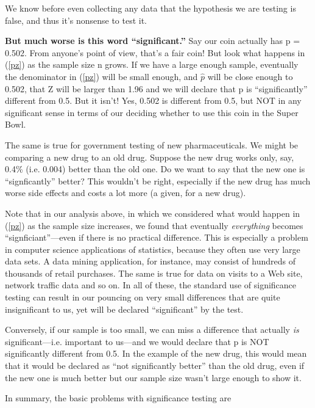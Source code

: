 We know before even collecting any data that the hypothesis we are
testing is false, and thus it's nonsense to test it.

{\bf But much worse is this word ``significant.''}  Say our coin actually
has p = 0.502.  From anyone's point of view, that's a fair coin!  But
look what happens in (\ref{pz}) as the sample size n grows.  If we have
a large enough sample, eventually the denominator in (\ref{pz}) will be
small enough, and $\widehat{p}$ will be close enough to 0.502, that Z will
be larger than 1.96 and we will declare that p is ``significantly''
different from 0.5.  But it isn't!  Yes, 0.502 is different from 0.5, but
NOT in any significant sense in terms of our deciding whether to use
this coin in the Super Bowl.

The same is true for government testing of new pharmaceuticals.  We
might be comparing a new drug to an old drug.  Suppose the new drug
works only, say, 0.4\% (i.e. 0.004) better than the old one.  Do we want
to say that the new one is ``signficantly'' better?  This wouldn't be
right, especially if the new drug has much worse side effects and costs
a lot more (a given, for a new drug).

Note that in our analysis above, in which we considered what would
happen in (\ref{pz}) as the sample size increases, we found that
eventually {\it everything} becomes ``signficiant''---even if there is no
practical difference.  This is especially a problem in computer science
applications of statistics, because they often use very large data sets.
A data mining application, for instance, may consist of hundreds of
thousands of retail purchases.  The same is true for data on visits to a
Web site, network traffic data and so on.  In all of these, the standard
use of significance testing can result in our pouncing on very small
differences that are quite insignificant to us, yet will be declared
``significant'' by the test.


Conversely, if our sample is too small, we can miss a difference that
actually {\it is} significant---i.e. important to us---and we would
declare that p is NOT significantly different from 0.5.  In the example
of the new drug, this would mean that it would be declared as ``not
significantly better'' than the old drug, even if the new one is much
better but our sample size wasn't large enough to show it.

In summary, the basic problems with significance testing are

